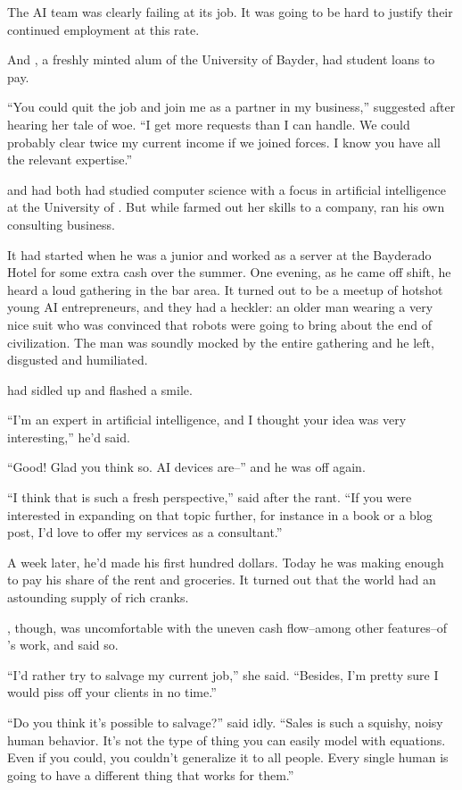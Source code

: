 The AI team was clearly failing at its job. It was going to be hard to justify their continued employment at this rate.

And {\protag}, a freshly minted alum of the University of Bayder, had student loans to pay.

``You could quit the job and join me as a partner in my business,'' {\sidetag} suggested after hearing her tale of woe. ``I get more requests than I can handle. We could probably clear twice my current income if we joined forces. I know you have all the relevant expertise.''

{\protag} and {\sidetag} had both had studied computer science with a focus in artificial intelligence at the University of  {\crunchyCity}. But while {\protag} farmed out her skills to a company, {\sidetag} ran his own consulting business.

It had started when he was a junior and worked as a server at the Bayderado Hotel for some extra cash over the summer. One evening, as he came off shift, he heard a loud gathering in the bar area. It turned out to be a meetup of hotshot young AI entrepreneurs, and they had a heckler: an older man wearing a very nice suit who was convinced that robots were going to bring about the end of civilization. The man was soundly mocked by the entire gathering and he left, disgusted and humiliated.

{\sidetag} had sidled up and flashed a smile.

``I'm an expert in artificial intelligence, and I thought your idea was very interesting,'' he'd said.

``Good! Glad you think so. AI devices are--'' and he was off again.

``I think that is such a fresh perspective,'' {\sidetag} said after the rant. ``If you were interested in expanding on that topic further, for instance in a book or a blog post, I'd love to offer my services as a consultant.''

A week later, he'd made his first hundred dollars. Today he was making enough to pay his share of the rent and groceries. It turned out that the world had an astounding supply of rich cranks.

{\protag}, though, was uncomfortable with the uneven cash flow--among other features--of {\sidetag}'s work, and said so.

``I'd rather try to salvage my current job,'' she said. ``Besides, I'm pretty sure I would piss off your clients in no time.''

``Do you think it's possible to salvage?'' {\sidetag} said idly. ``Sales is such a squishy, noisy human behavior. It's not the type of thing you can easily model with equations. Even if you could, you couldn't generalize it to all people. Every single human is going to have a different thing that works for them.''

